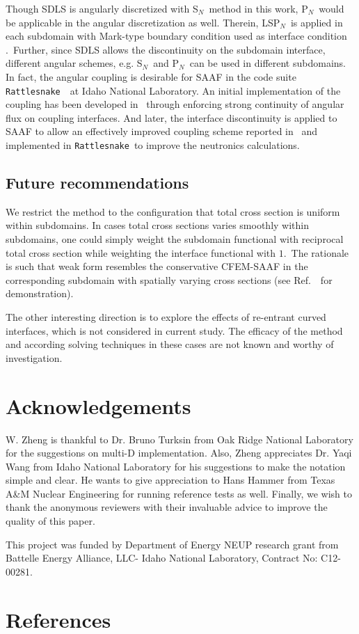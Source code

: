 \documentclass[review]{elsarticle}
\newcommand{\sn}{S$_N$}
\newcommand{\pn}{P$_N$}
\begin{document}
Though SDLS is angularly discretized with \sn\ method in this work, \pn\ would be applicable in the angular discretization as well. Therein, LS\pn\cite{zheng_invite,manteuffel_lspn_scaling,varin_lspn}\ is applied in each subdomain with Mark-type boundary condition used as interface condition \cite{sanchez-transport}.\ Further, since SDLS allows the discontinuity on the subdomain interface, different angular schemes, e.g. \sn\ and \pn\ can be used in different subdomains. {In fact, the angular coupling is desirable for SAAF in the code suite {\tt Rattlesnake}\ \cite{yaqi-rattlesnake}\ at Idaho National Laboratory. An initial implementation of the coupling has been developed in \cite{yaqi_physor16}\ through enforcing strong continuity of angular flux on coupling interfaces. And later, the interface discontinuity is applied to SAAF to allow an effectively improved coupling scheme reported in \cite{yaqi_invite,zheng-inl}\ and implemented in {\tt Rattlesnake}\ to improve the neutronics calculations.}

\subsection{Future recommendations}
{We restrict the method to the configuration that total cross section is uniform within subdomains. In cases total cross sections varies smoothly within subdomains, one could simply weight the subdomain functional with reciprocal total cross section while weighting the interface functional with $1$.\ The rationale is such that weak form resembles the conservative CFEM-SAAF in the corresponding subdomain with spatially varying cross sections (see Ref.\ \cite{zheng_dissertation}\ for demonstration).}

{The other interesting direction is to explore the effects of re-entrant curved interfaces, which is not considered in current study. The efficacy of the method and according solving techniques in these cases are not known and worthy of investigation.}
\section*{Acknowledgements}
W. Zheng is thankful to Dr. Bruno Turksin from Oak Ridge National Laboratory for the suggestions on multi-D implementation. Also, Zheng appreciates Dr. Yaqi Wang from Idaho National Laboratory for his suggestions to make the notation simple and clear. He wants to give appreciation to Hans Hammer from Texas A\&M Nuclear Engineering for running reference tests as well. Finally, we wish to thank the anonymous reviewers with their invaluable advice to improve the quality of this paper.

This project was funded by Department of Energy NEUP research grant from Battelle Energy Alliance, LLC- Idaho National Laboratory, Contract No: C12-00281.
\section*{References}

\end{document}
